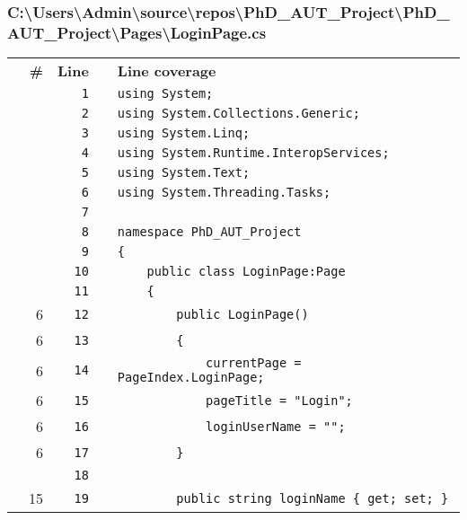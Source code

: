 \documentclass[a4paper,landscape,10pt]{article}
\begin{document}
\subsubsection{C:\textbackslash Users\textbackslash Admin\textbackslash source\textbackslash repos\textbackslash PhD\_AUT\_Project\textbackslash PhD\_AUT\_Project\textbackslash Pages\textbackslash LoginPage.cs}
\begin{longtable}[l]{lrrll}
\textbf{} & \textbf{\#} & \textbf{Line} & \textbf{} & \textbf{Line coverage}\\
\cellcolor{gray} &  & \verb~1~ & & \verb~using System;~\\
\cellcolor{gray} &  & \verb~2~ & & \verb~using System.Collections.Generic;~\\
\cellcolor{gray} &  & \verb~3~ & & \verb~using System.Linq;~\\
\cellcolor{gray} &  & \verb~4~ & & \verb~using System.Runtime.InteropServices;~\\
\cellcolor{gray} &  & \verb~5~ & & \verb~using System.Text;~\\
\cellcolor{gray} &  & \verb~6~ & & \verb~using System.Threading.Tasks;~\\
\cellcolor{gray} &  & \verb~7~ & & \verb~~\\
\cellcolor{gray} &  & \verb~8~ & & \verb~namespace PhD_AUT_Project~\\
\cellcolor{gray} &  & \verb~9~ & & \verb~{~\\
\cellcolor{gray} &  & \verb~10~ & & \verb~    public class LoginPage:Page~\\
\cellcolor{gray} &  & \verb~11~ & & \verb~    {~\\
\cellcolor{green} & 6 & \verb~12~ & & \verb~        public LoginPage()~\\
\cellcolor{green} & 6 & \verb~13~ & & \verb~        {~\\
\cellcolor{green} & 6 & \verb~14~ & & \verb~            currentPage = PageIndex.LoginPage;~\\
\cellcolor{green} & 6 & \verb~15~ & & \verb~            pageTitle = "Login";~\\
\cellcolor{green} & 6 & \verb~16~ & & \verb~            loginUserName = "";~\\
\cellcolor{green} & 6 & \verb~17~ & & \verb~        }~\\
\cellcolor{gray} &  & \verb~18~ & & \verb~~\\
\cellcolor{green} & 15 & \verb~19~ & & \verb~        public string loginName { get; set; }~\\

\end{longtable}
\end{document}
